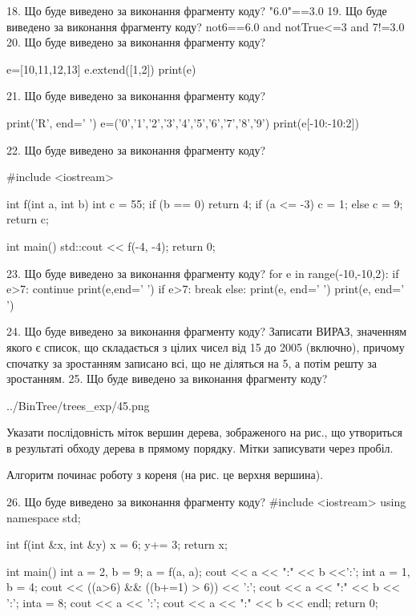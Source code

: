 \documentclass[11pt]{article}
\begin{document}
18. Що буде виведено за виконання фрагменту коду?
"6.0"==3.0
19. Що буде виведено за виконання фрагменту коду?
not6==6.0 and notTrue<=3 and 7!=3.0
20. Що буде виведено за виконання фрагменту коду?

e=[10,11,12,13]
e.extend([1,2])
print(e)


21. Що буде виведено за виконання фрагменту коду?

print('R', end=' ')
e=('0','1','2','3','4','5','6','7','8','9')
print(e[-10:-10:2])


22. Що буде виведено за виконання фрагменту коду?

#include <iostream>

int f(int a, int b){
    int c = 55;
    if (b == 0)
        return 4;
    if (a <= -3)
         c = 1;
    else 
        c = 9;
    return c;
}

int main(){
    std::cout << f(-4, -4);
    return 0;
}

23. Що буде виведено за виконання фрагменту коду?
for e in range(-10,-10,2):
    if e>7:
        continue
        print(e,end=' ')
    if e>7:
        break
else:
    print(e, end=' ')
print(e, end=' ')

24. Що буде виведено за виконання фрагменту коду?
Записати ВИРАЗ, значенням якого є список, що складається з цілих чисел від 15 до 2005 (включно), причому спочатку за зростанням записано всі, що не діляться на 5, а потім решту за зростанням.
25. Що буде виведено за виконання фрагменту коду?

\begin{center}
	{../BinTree/trees_exp/45.png}
\end{center}
Указати послідовність міток вершин дерева, зображеного на рис., що утвориться в результаті обходу дерева в прямому порядку. Мітки записувати через пробіл.\par Алгоритм починає роботу з кореня (на рис. це верхня вершина).

26. Що буде виведено за виконання фрагменту коду?
#include <iostream>
using namespace std;

int f(int &x, int &y){
    x = 6;
    y+= 3;
    return x;
}

int main(){
    int a = 2, b = 9;
    a = f(a, a);
    cout << a << ":" << b <<':';
    {
        int a = 1, b = 4;
        cout << ((a>6) && ((b+=1) > 6)) << ':';
        cout << a << ":" << b << ':';
    }
    {
        inta = 8;
        cout << a << ':';
    }
    cout << a << ":" << b << endl;
    return 0;
}
\end{document}

